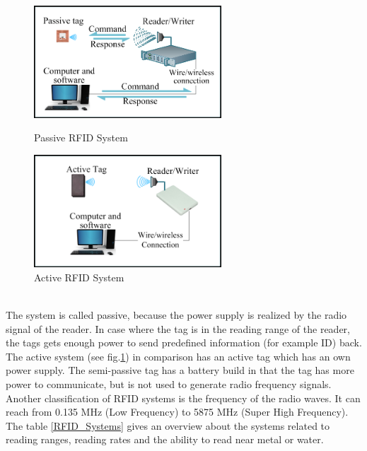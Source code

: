 \begin{figure}[!htbp]
\centering
\begin{minipage}{.5\textwidth}
\centering
\includegraphics[width = 7cm]{Pictures/RFID_Passive}%
\caption[Passive RFID System]{Passive RFID System \footnotemark}
\label{RFID_Passive}
\end{minipage}%
\begin{minipage}{.5\textwidth}
\centering
\includegraphics[width = 7cm]{Pictures/RFID_Active}%
\caption[Active RFID System]{Active RFID System \footnotemark[2]}
\label{RFID_Active}
\end{minipage}
\end{figure}\\
The system is called passive, because the power supply is realized by the radio signal of the reader. In case where the tag is in the reading range of the reader, the tags gets enough power to send predefined information (for example ID) back. The active system (see fig.\ref{RFID_Active}) in comparison has an active tag which has an own power supply. The semi-passive tag has a battery build in that the tag has more power to communicate, but is not used to generate radio frequency signals.\\ 
Another classification of RFID systems is the frequency of the radio waves. It can reach from 0.135 MHz (Low Frequency) to 5875 MHz (Super High Frequency). The table \ref{RFID_Systems} gives an overview about the systems related to reading ranges, reading rates and the ability to read near metal or water.\\

